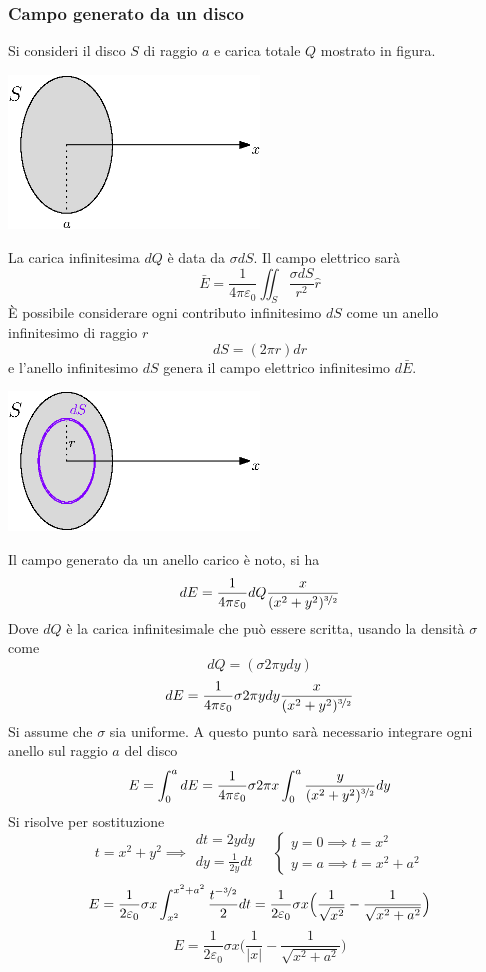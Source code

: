 \documentclass[10pt, letterpaper]{report}
\begin{document}
\subsubsection{Campo generato da un disco}
Si consideri il disco $S$ di raggio $a$ e carica  totale $Q$ mostrato in figura.\begin{center}
    \includegraphics[width=0.5\textwidth]{images/discoCarico.eps}
\end{center}
La carica infinitesima $dQ$ è data da $\sigma dS$. Il campo elettrico sarà 
$$ \bar E = \frac{1}{4\pi\varepsilon_0}\iint_S \frac{\sigma dS}{r^2}\hat r $$
È possibile considerare ogni contributo infinitesimo $dS$ come un anello infinitesimo di raggio 
$r$
$$ dS=(2\pi r)dr$$
e l'anello infinitesimo $dS$ genera il campo elettrico infinitesimo $d\bar E$.
\begin{center}
    \includegraphics[width=0.5\textwidth]{images/discoCarico2.eps}
\end{center}
Il campo generato da un anello carico è noto, si ha 
$$ dE=\frac{1}{4\pi\varepsilon_0}dQ\frac{x}{(x^2+y^2)^{\nicefrac{3}{2}}}$$
Dove $dQ$ è la carica infinitesimale che può essere scritta, usando la densità $\sigma$ come 
$$ dQ=(\sigma 2\pi ydy)$$
$$ dE=\frac{1}{4\pi\varepsilon_0}\sigma 2\pi ydy \frac{x}{(x^2+y^2)^{\nicefrac{3}{2}}}$$
Si assume che $\sigma$ sia uniforme. A questo punto sarà necessario integrare ogni anello sul raggio 
$a$ del disco 
$$E=\int_0^a dE = \frac{1}{4\pi\varepsilon_0}\sigma 2\pi x \int_0^a \frac{y}{(x^2+y^2)^{\nicefrac{3}{2}}}dy $$
Si risolve per sostituzione 
$$ t=x^2+y^2 \implies \begin{matrix}
    dt=2ydy \\ dy=\frac{1}{2y}dt
\end{matrix} \ \ \ \ \begin{cases}
    y=0\implies t=x^2 \\ 
    y=a\implies t = x^2+a^2
\end{cases}$$
$$E= \frac{1}{2\varepsilon_0}\sigma x \int_{x^2}^{x^2+a^2}\frac{t^{-\nicefrac{3}{2}}}{2}dt = 
\frac{1}{2\varepsilon_0}\sigma x\Big( \frac{1}{\sqrt{x^2}}-\frac{1}{\sqrt{x^2+a^2}} \Big)
$$
$$ E=\frac{1}{2\varepsilon_0}\sigma x\Big( \frac{1}{|x|}-\frac{1}{\sqrt{x^2+a^2}} \Big)$$
\end{document}
